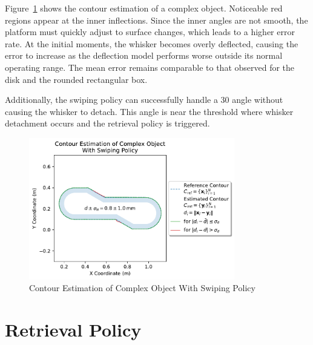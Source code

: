 Figure~\ref{fig:experiment-complex-object-swiping} shows the contour estimation of a complex object.
Noticeable red regions appear at the inner inflections.
Since the inner angles are not smooth, the platform must quickly adjust to surface changes, which leads to a higher error rate.
At the initial moments, the whisker becomes overly deflected, causing the error to increase as the deflection model performs worse outside its normal operating range.
The mean error remains comparable to that observed for the disk and the rounded rectangular box.

Additionally, the swiping policy can successfully handle a 30\degree{} angle without causing the whisker to detach.
This angle is near the threshold where whisker detachment occurs and the retrieval policy is triggered.

\begin{figure}[!htb]
    \centering
    \includegraphics[width=0.8\textwidth]{figures/experiments/complex-object-swiping}
    \caption{Contour Estimation of Complex Object With Swiping Policy}
    \label{fig:experiment-complex-object-swiping}
\end{figure}


\section{Retrieval Policy}

